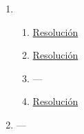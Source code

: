 \documentclass[a4paper]{article}
\newcommand{\exercise}{\item}
\begin{document}
\begin{enumerate}
\begin{enumerate} [label=(\alph*)]
		\item \href{https://youtu.be/EQIEmdkGOZE}{Resolución}
		\item \href{https://youtu.be/BCo0pxE288w}{Resolución}
\end{enumerate}\exercise\begin{enumerate} [label=(\alph*)]		\item \href{https://youtu.be/_XVYatmUKBg}{Resolución}
		\item \href{https://youtu.be/LDpq_f-baPc}{Resolución}
\item ---		\item \href{https://youtu.be/LDpq_f-baPc}{Resolución}
\end{enumerate}\exercise---\end{enumerate}
\end{document}
